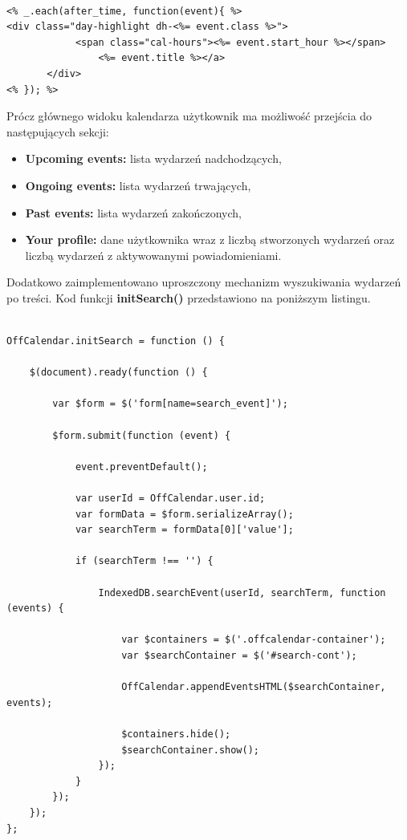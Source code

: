 \begin{lstlisting}[caption=Fragment kodu prezentujący składnię Underscore.js., label=amb, captionpos=b]

<% _.each(after_time, function(event){ %>
<div class="day-highlight dh-<%= event.class %>">
       		<span class="cal-hours"><%= event.start_hour %></span>
              	<%= event.title %></a>
       </div>
<% }); %>

\end{lstlisting}

Prócz głównego widoku kalendarza użytkownik ma możliwość przejścia do następujących sekcji:

\begin{itemize}
\item \textbf{Upcoming events:} lista wydarzeń nadchodzących,
\item \textbf{Ongoing events:} lista wydarzeń trwających,
\item \textbf{Past events:} lista wydarzeń zakończonych,
\item \textbf{Your profile:} dane użytkownika wraz z liczbą stworzonych wydarzeń oraz liczbą wydarzeń z aktywowanymi powiadomieniami.
\end{itemize}

Dodatkowo zaimplementowano uproszczony mechanizm wyszukiwania wydarzeń po treści. Kod funkcji \textbf{initSearch()} przedstawiono na poniższym listingu.

\begin{lstlisting}[caption=Wyszukiwanie wydarzeń w oparciu o treść., label=amb, captionpos=b]

OffCalendar.initSearch = function () {

    $(document).ready(function () {
    
        var $form = $('form[name=search_event]');

        $form.submit(function (event) {

            event.preventDefault();

            var userId = OffCalendar.user.id;
            var formData = $form.serializeArray();
            var searchTerm = formData[0]['value'];

            if (searchTerm !== '') {

                IndexedDB.searchEvent(userId, searchTerm, function (events) {

                    var $containers = $('.offcalendar-container');
                    var $searchContainer = $('#search-cont');

                    OffCalendar.appendEventsHTML($searchContainer, events);

                    $containers.hide();
                    $searchContainer.show();
                });
            }
        });
    });
};

\end{lstlisting}

